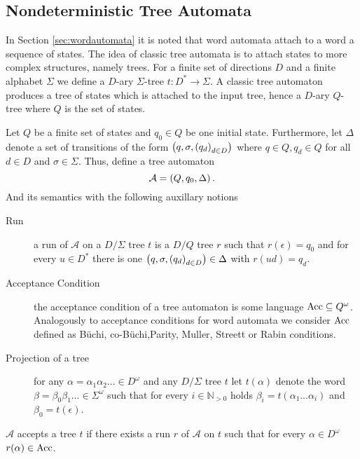 \subsection{Nondeterministic Tree Automata}
In Section \ref{sec:wordautomata} it is noted that word automata attach to a
word a sequence of states. The idea of classic tree automata is to attach
states to more complex structures, namely trees. For a finite set of
directions $D$ and a finite alphabet $\Sigma$ we define a $D$-ary $\Sigma$-tree
$t:D^{*}\rightarrow\Sigma$. A classic tree automaton produces a tree of states
which is attached to the input tree, hence a $D$-ary $Q$-tree where $Q$ is the
set of states.
\begin{definition}
  Let $Q$ be a finite set of states and $q_{0}\in Q$ be one initial state.
  Furthermore, let $\Delta$ denote a set of transitions of the form
  $\left(q,\sigma, \left(q_{d}\right)_{d\in D}\right)$ where $q\in Q, q_{d}\in Q$ for
  all $d\in D$ and $\sigma\in\Sigma$. Thus, define a tree automaton
  \begin{equation*}
    \mathcal{A} = \left(Q, q_{0}, \Delta\right).
  \end{equation*}
  And its semantics with the following auxillary notions
  \begin{description}
    \item[Run] a run of $\mathcal{A}$ on a $D/\Sigma$ tree $t$ is a $D/Q$ tree
      $r$ such that $r(\epsilon) = q_{0}$ and for every $u\in D^{*}$ there is
      one $\left(q,\sigma, \left(q_{d}\right)_{d\in D}\right)\in\Delta$ with
      $r(ud) = q_{d}$.
    \item[Acceptance Condition] the acceptance condition of a tree automaton is
      some language $\operatorname{Acc}\subseteq Q^{\omega}$. Analogously to acceptance
      conditions for word automata we consider $\operatorname{Acc}$ defined as Büchi,
      co-Büchi,Parity, Muller, Streett or Rabin conditions.
    \item[Projection of a tree] for any $\alpha=\alpha_{1}\alpha_{2}\dots\in
      D^{\omega}$ and any $D/\Sigma$ tree $t$ let $t(\alpha)$ denote the word
      $\beta = \beta_{0}\beta_{1}\dots\in\Sigma^{\omega}$ such that for every
      $i\in\mathbb{N}_{>0}$ holds $\beta_{i} = t(\alpha_{1}\dots\alpha_{i})$
      and $\beta_{0} = t(\epsilon)$.
  \end{description}
  $\mathcal{A}$ accepts a tree $t$ if there exists a run $r$ of $\mathcal{A}$
  on $t$ such that for every $\alpha\in D^{\omega}$ $r(\alpha)\in\operatorname{Acc}$.
\end{definition}
